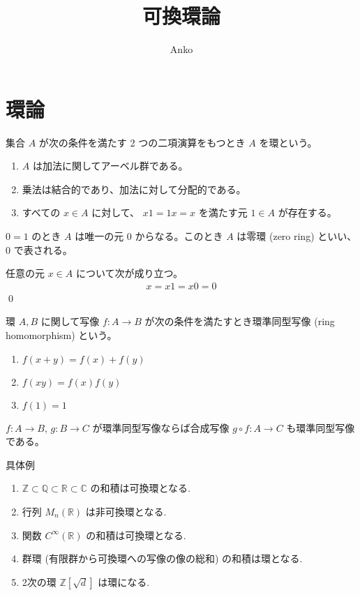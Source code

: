 \documentclass[uplatex,dvipdfmx,a4paper,11pt]{jlreq}
\title{可換環論}
\author{Anko}
\makeatletter
\theoremstyle{definition}
\renewenvironment{proof}[1][\proofname]{\par
  \normalfont
  \topsep6\p@\@plus6\p@ \trivlist
  \item[\hskip\labelsep{\bfseries #1}\@addpunct{\bfseries}]\ignorespaces\quad\par
}{%
  \qed\endtrivlist\@endpefalse
}
\renewcommand\proofname{証明}
\makeatother
\begin{document}
\maketitle
\tableofcontents
\clearpage

\section{環論}
\begin{definition}[環 (ring)]
  集合 $A$ が次の条件を満たす 2 つの二項演算をもつとき $A$ を環という。
  \begin{enumerate}
    \item $A$ は加法に関してアーベル群である。
    \item 乗法は結合的であり、加法に対して分配的である。
    \item すべての $x\in A$ に対して、 $x1 = 1x = x$ を満たす元 $1\in A$ が存在する。
  \end{enumerate}
\end{definition}

\begin{proposition}
  $0 = 1$ のとき $A$ は唯一の元 $0$ からなる。このとき $A$ は零環 (zero ring) といい、$0$ で表される。
\end{proposition}
\begin{proof}
  任意の元 $x\in A$ について次が成り立つ。
  \begin{align}
    x = x1 = x0 = 0
  \end{align}
\end{proof}

\begin{definition}
  環 $A, B$ に関して写像 $f: A\to B$ が次の条件を満たすとき環準同型写像 (ring homomorphism) という。
  \begin{enumerate}
    \item $f(x + y) = f(x) + f(y)$
    \item $f(xy) = f(x)f(y)$
    \item $f(1) = 1$
  \end{enumerate}
\end{definition}

\begin{proposition}
  $f: A\to B$, $g: B\to C$ が環準同型写像ならば合成写像 $g\circ f: A\to C$ も環準同型写像である。
\end{proposition}

具体例
\begin{enumerate}
  \item $\mathbb{Z}\subset\mathbb{Q}\subset\mathbb{R}\subset\mathbb{C}$ の和積は可換環となる.
  \item 行列 $M_n(\mathbb{R})$ は非可換環となる.
  \item 関数 $C^\infty(\mathbb{R})$ の和積は可換環となる.
  \item 群環 (有限群から可換環への写像の像の総和) の和積は環となる.
  \item 2次の環 $\mathbb{Z}[\sqrt{d}]$ は環になる.
\end{enumerate}
\end{document}
